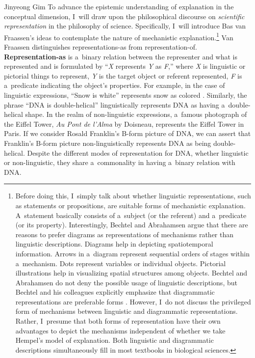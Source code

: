 \begin{artengenv}{Jinyeong Gim}
To advance the epistemic understanding of explanation in the conceptual dimension, I~will draw upon the philosophical discourse on \textit{scientific representation} in the philosophy of science. Specifically, I~will introduce Bas van Fraassen's ideas to contemplate the nature of mechanistic explanation.\footnote{Before doing this, I~simply talk about whether linguistic representations, such as statements or propositions, are suitable forms of mechanistic explanation. A~statement basically consists of a~subject (or the referent) and a~predicate (or its property). Interestingly, Bechtel and Abrahamsen argue that there are reasons to prefer diagrams as representations of mechanisms rather than linguistic descriptions. Diagrams help in depicting spatiotemporal information. Arrows in a~diagram represent sequential orders of stages within a~mechanism. Dots represent variables or individual objects. Pictorial illustrations help in visualizing spatial structures among objects. Bechtel and Abrahamsen
\parencite*[][p.429]{bechtel_explanation_2005} %
 do not deny the possible usage of linguistic descriptions, but Bechtel and his colleagues explicitly emphasize that diagrammatic representations are preferable forms 
\parencites[see][p.432]{bechtel_explanation_2005}[][p.52]{wright_mechanisms_2007}[][p.xix]{bechtel_discovering_2010}. %
 However, I~do not discuss the privileged form of mechanisms between linguistic and diagrammatic representations. Rather, I~presume that both forms of representation have their own advantages to depict the mechanisms independent of whether we take Hempel's model of explanation. Both linguistic and diagrammatic descriptions simultaneously fill in most textbooks in biological sciences.} Van Fraassen distinguishes representations-as from representation-of. \textbf{Representation-as} is a~binary relation between the representer and what is represented and is formulated by ``\textit{X} represents \textit{Y} as \textit{F},'' where \textit{X} is linguistic or pictorial things to represent, \textit{Y} is the target object or referent represented, \textit{F} is a~predicate indicating the object's properties. For example, in the case of linguistic expressions, ``Snow is white'' represents snow as colored 
\parencite[][p.16]{van_fraassen_scientific_2008}. %
 Similarly, the phrase ``DNA is double-helical'' linguistically represents DNA as having a~double-helical shape. In the realm of non-linguistic expressions, a~famous photograph of the Eiffel Tower, \textit{Au Pont de l'Alma} by Doisneau, represents the Eiffel Tower in Paris. If we consider Rosald Franklin's B-form picture of DNA, we can assert that Franklin's B-form picture non-linguistically represents DNA as being double-helical. Despite the different modes of representation for DNA, whether linguistic or non-linguistic, they share a~commonality in having a~binary relation with DNA.


\end{artengenv}
